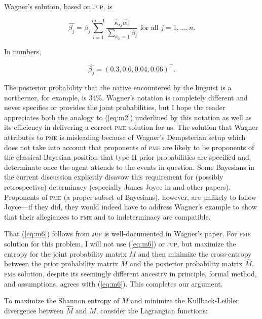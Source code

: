 \documentclass[phd,12pt,oneside]{ubcthesis}
\begin{document}
{\noindent}Wagner's solution, based on \textsc{jup}, is

\begin{equation}
  \label{eq:m6}
  \hat{\beta_{j}}=\beta_{j}\sum_{i=1}^{m-1}\frac{\hat{\kappa}_{ij}\hat{\alpha_{i}}}{\sum_{\hat{\kappa}_{il}=1}\beta_{l}}\mbox{ for all }j=1,\ldots,n.
\end{equation}

{\noindent}In numbers,

\begin{equation}
  \label{eq:m7}
  \hat{\beta_{j}}=(0.3,0.6,0.04,0.06)^{\top}.
\end{equation}

{\noindent}The posterior probability that the native encountered by
the linguist is a northerner, for example, is 34\%. Wagner's notation
is completely different and never specifies or provides the joint
probabilities, but I hope the reader appreciates both the analogy to
(\ref{eq:m2}) underlined by this notation as well as its efficiency in
delivering a correct \textsc{pme} solution for us. The solution that
Wagner attributes to \textsc{pme} is misleading because of Wagner's
Dempsterian setup which does not take into account that proponents of
\textsc{pme} are likely to be proponents of the classical Bayesian
position that type II prior probabilities are specified and
determinate once the agent attends to the events in question. Some
Bayesians in the current discussion explicitly disavow this
requirement for (possibly retrospective) determinacy (especially James
Joyce in  and other papers). Proponents of
\textsc{pme} (a proper subset of Bayesians), however, are unlikely to
follow Joyce---if they did, they would indeed have to address Wagner's
example to show that their allegiances to \textsc{pme} and to
indeterminacy are compatible.

That (\ref{eq:m6}) follows from \textsc{jup} is well-documented in
Wagner's paper. For \textsc{pme} solution for this problem, I
will not use (\ref{eq:m6}) or \textsc{jup}, but maximize the entropy
for the joint probability matrix $M$ and then minimize the
cross-entropy between the prior probability matrix $M$ and the
posterior probability matrix $\hat{M}$. \textsc{pme} solution,
despite its seemingly different ancestry in principle, formal method,
and assumptions, agrees with (\ref{eq:m6}). This completes our
argument.

To maximize the Shannon entropy of $M$ and minimize the
Kullback-Leibler divergence between $\hat{M}$ and $M$, consider the
Lagrangian functions:
\end{document}
